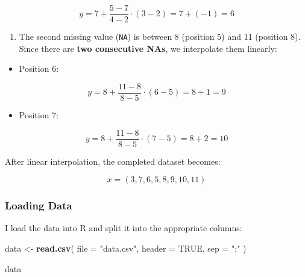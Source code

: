 \documentclass[
]{article}
\newenvironment{Shaded}{\begin{snugshade}}{\end{snugshade}}
\newcommand{\AttributeTok}[1]{\textcolor[rgb]{0.13,0.29,0.53}{#1}}
\newcommand{\ConstantTok}[1]{\textcolor[rgb]{0.56,0.35,0.01}{#1}}
\newcommand{\FunctionTok}[1]{\textcolor[rgb]{0.13,0.29,0.53}{\textbf{#1}}}
\newcommand{\NormalTok}[1]{#1}
\newcommand{\OtherTok}[1]{\textcolor[rgb]{0.56,0.35,0.01}{#1}}
\newcommand{\StringTok}[1]{\textcolor[rgb]{0.31,0.60,0.02}{#1}}
\providecommand{\tightlist}{%
  \setlength{\itemsep}{0pt}\setlength{\parskip}{0pt}}
\begin{document}
\[
y = 7 + \frac{5 - 7}{4 - 2} \cdot (3 - 2) = 7 + (-1) = 6
\]

\begin{enumerate}
\def\labelenumi{\arabic{enumi}.}
\setcounter{enumi}{1}
\tightlist
\item
  The second missing value (\texttt{NA}) is between 8 (position 5) and
  11 (position 8). Since there are \textbf{two consecutive NAs}, we
  interpolate them linearly:
\end{enumerate}

\begin{itemize}
\tightlist
\item
  Position 6:
\end{itemize}

\[
y = 8 + \frac{11 - 8}{8 - 5} \cdot (6 - 5) = 8 + 1 = 9
\]

\begin{itemize}
\tightlist
\item
  Position 7:
\end{itemize}

\[
y = 8 + \frac{11 - 8}{8 - 5} \cdot (7 - 5) = 8 + 2 = 10
\]

After linear interpolation, the completed dataset becomes:

\[
x = (3, 7, 6, 5, 8, 9, 10, 11)
\]

\subsubsection{Loading Data}\label{loading-data}

I load the data into R and split it into the appropriate columns:

\begin{Shaded}
\begin{Highlighting}[]
\NormalTok{data }\OtherTok{\textless{}{-}} \FunctionTok{read.csv}\NormalTok{(}
  \AttributeTok{file =} \StringTok{"data.csv"}\NormalTok{,}
  \AttributeTok{header =} \ConstantTok{TRUE}\NormalTok{,}
  \AttributeTok{sep =} \StringTok{";"}
\NormalTok{)}
\end{Highlighting}
\end{Shaded}

\begin{Shaded}
\begin{Highlighting}[]
\NormalTok{data}
\end{Highlighting}
\end{Shaded}
\end{document}
